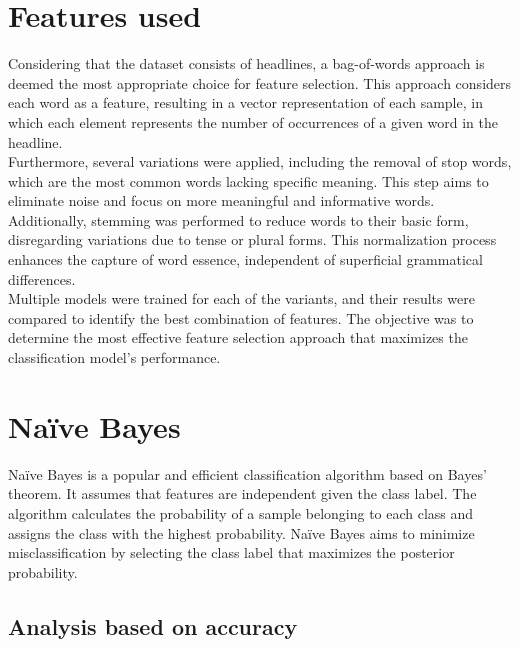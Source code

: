 \documentclass{class}
\begin{document}
\section{Features used}
Considering that the dataset consists of headlines, a bag-of-words approach is deemed the most appropriate choice for feature selection.
This approach considers each word as a feature, resulting in a vector representation of each sample,
in which each element represents the number of occurrences of a given word in the headline.\\
Furthermore, several variations were applied, including the removal of stop words, which are the most common words lacking specific meaning.
This step aims to eliminate noise and focus on more meaningful and informative words.\\
Additionally, stemming was performed to reduce words to their basic form, disregarding variations due to tense or plural forms.
This normalization process enhances the capture of word essence, independent of superficial grammatical differences.\\
Multiple models were trained for each of the variants, and their results were compared to identify the best combination of features.
The objective was to determine the most effective feature selection approach that maximizes the classification model's performance.
\section{Na\"ive Bayes}
Na\"ive Bayes is a popular and efficient classification algorithm based on Bayes' theorem.
It assumes that features are independent given the class label. The algorithm calculates the probability of a
sample belonging to each class and assigns the class with the highest probability.
Na\"ive Bayes aims to minimize misclassification by selecting the class label that maximizes the posterior probability.
\subsection{Analysis based on accuracy}
\end{document}
